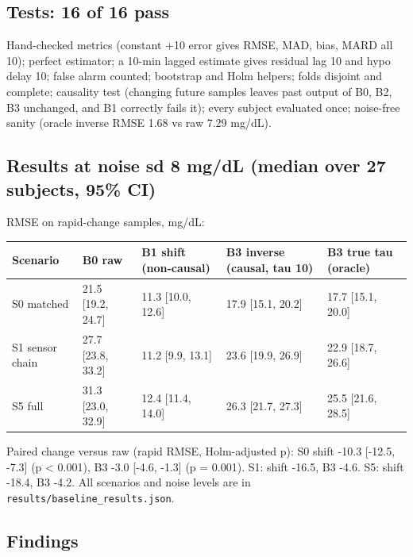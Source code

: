 \documentclass[11pt,a4paper]{article}
\begin{document}
\hypertarget{tests-16-of-16-pass}{%
\subsection{Tests: 16 of 16 pass}\label{tests-16-of-16-pass}}

Hand-checked metrics (constant +10 error gives RMSE, MAD, bias, MARD all
10); perfect estimator; a 10-min lagged estimate gives residual lag 10
and hypo delay 10; false alarm counted; bootstrap and Holm helpers;
folds disjoint and complete; causality test (changing future samples
leaves past output of B0, B2, B3 unchanged, and B1 correctly fails it);
every subject evaluated once; noise-free sanity (oracle inverse RMSE
1.68 vs raw 7.29 mg/dL).

\hypertarget{results-at-noise-sd-8-mgdl-median-over-27-subjects-95-ci}{%
\subsection{Results at noise sd 8 mg/dL (median over 27 subjects, 95\%
CI)}\label{results-at-noise-sd-8-mgdl-median-over-27-subjects-95-ci}}

RMSE on rapid-change samples, mg/dL:

\begin{longtable}[]{@{}lllll@{}}
\toprule\noalign{}
Scenario & B0 raw & B1 shift (non-causal) & B3 inverse (causal, tau 10)
& B3 true tau (oracle) \\
\midrule\noalign{}
\endhead
\bottomrule\noalign{}
\endlastfoot
S0 matched & 21.5 {[}19.2, 24.7{]} & 11.3 {[}10.0, 12.6{]} & 17.9
{[}15.1, 20.2{]} & 17.7 {[}15.1, 20.0{]} \\
S1 sensor chain & 27.7 {[}23.8, 33.2{]} & 11.2 {[}9.9, 13.1{]} & 23.6
{[}19.9, 26.9{]} & 22.9 {[}18.7, 26.6{]} \\
S5 full & 31.3 {[}23.0, 32.9{]} & 12.4 {[}11.4, 14.0{]} & 26.3 {[}21.7,
27.3{]} & 25.5 {[}21.6, 28.5{]} \\
\end{longtable}

Paired change versus raw (rapid RMSE, Holm-adjusted p): S0 shift -10.3
{[}-12.5, -7.3{]} (p \textless{} 0.001), B3 -3.0 {[}-4.6, -1.3{]} (p =
0.001). S1: shift -16.5, B3 -4.6. S5: shift -18.4, B3 -4.2. All
scenarios and noise levels are in
\texttt{results/baseline\_results.json}.

\hypertarget{findings}{%
\subsection{Findings}\label{findings}}
\end{document}
